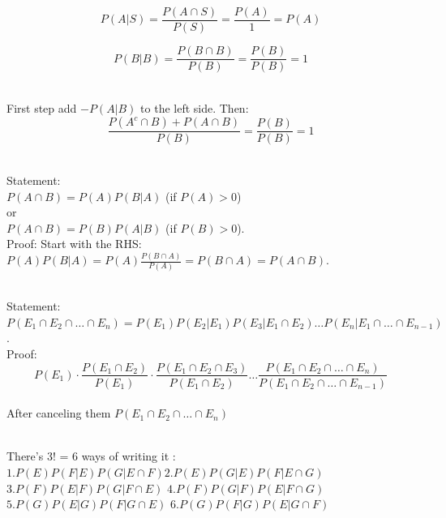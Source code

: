 \documentclass[12pt]{article}
\begin{document}

\begin{enumerate}


$$P(A|S) = \frac{P(A \cap S)}{P(S)} = \frac{P(A)}{1} = P(A)$$


$$P(B|B) = \frac{P(B \cap B)}{P(B)} = \frac{P(B)}{P(B)} = 1$$



\\First step add $- P(A|B)$ to the left side. Then:$$\frac{P(A^c \cap B) + P(A \cap B)}{P(B)} = \frac{P(B)}{P(B)} = 1$$



\\
Statement: \\$P(A \cap B) = P(A)P(B|A)$ (if $P(A)>0$)\\ or\\ $P(A \cap B) = P(B)P(A|B)$ (if $P(B)>0$).\\Proof: Start with the RHS: \\$P(A)P(B|A) = P(A) \frac{P(B \cap A)}{P(A)} = P(B \cap A) = P(A \cap B)$.


\\
Statement:\\ $P(E_1 \cap E_2 \cap \dots \cap E_n) = P(E_1)P(E_2|E_1)P(E_3|E_1 \cap E_2) \dots P(E_n|E_1 \cap \dots \cap E_{n-1})$.\\
Proof:
\\$$P(E_1) \cdot \frac{P(E_1 \cap E_2)}{P(E_1)} \cdot \frac{P(E_1 \cap E_2 \cap E_3)}{P(E_1 \cap E_2)} \dots \frac{P(E_1 \cap E_2 \cap \dots \cap E_n)}{P(E_1 \cap E_2 \cap \dots \cap E_{n-1})}$$
\\After canceling them $P(E_1 \cap E_2 \cap \dots \cap E_n)$


\\There's 3! = 6 ways of writing it : \\$1.P(E) P(F|E) P(G|E \cap F)$\space$2.P(E) P(G|E) P(F|E \cap G)$\space
$3.P(F)P(E|F)P(G|F \cap E)$ \space$4.P(F)P(G|F)P(E|F \cap G)$ \space$5.P(G)P(E|G)P(F|G \cap E)$ \space$6.P(G)P(F|G)P(E|G \cap F)$ 

\end{enumerate}
\newpage
\end{document}
